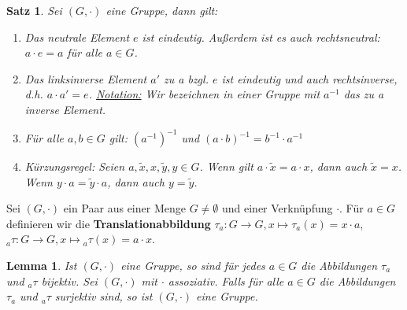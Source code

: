 \documentclass[12pt,a4paper]{article}
\theoremstyle{plain}
\newtheorem{Satz}[Theorem]{Satz}
\newtheorem{Lemma}[Theorem]{Lemma}
\numberwithin{equation}{section}
\begin{document}
\begin{Satz}
Sei $(G,\cdot)$ eine Gruppe, dann gilt:
\begin{enumerate}
\renewcommand{\labelenumi}{\emph{(\alph{enumi})}}
\item Das neutrale Element $e$ ist eindeutig. Außerdem ist es auch rechtsneutral: $a\cdot e=a$ für alle $a\in G$.
\item Das linksinverse Element $a'$ zu a bzgl. $e$ ist eindeutig und auch rechtsinverse, d.h. $a\cdot a'=e$. \underline{Notation:} Wir bezeichnen in einer Gruppe mit $a^{-1}$ das zu a inverse Element.
\item Für alle $a,b\in G$ gilt: $\left(a^{-1}\right)^{-1}$ und $(a\cdot b)^{-1}=b^{-1}\cdot a^{-1}$
\item Kürzungsregel: Seien $a,\tilde{x},x,\tilde{y},y\in G$. Wenn gilt $a\cdot \tilde{x}=a\cdot x$, dann auch $\tilde{x}=x$. Wenn $y\cdot a=\tilde{y}\cdot a$, dann auch $y=\tilde{y}$.
\end{enumerate}
\end{Satz}
Sei $(G,\cdot)$ ein Paar aus einer Menge $G\neq \emptyset$ und einer Verknüpfung $\cdot$. Für $a\in G$ definieren wir die \textbf{Translationabbildung} $\tau_a: G\rightarrow G, x\mapsto \tau_a(x)=x\cdot a$, $_a\tau: G \rightarrow G, x\mapsto {}_a\tau(x)=a\cdot x$.
\begin{Lemma}
Ist $(G,\cdot)$ eine Gruppe, so sind für jedes $a\in G$ die Abbildungen $\tau_a$ und $_a\tau$ bijektiv. Sei $(G,\cdot)$ mit $\cdot$ assoziativ. Falls für alle $a\in G$ die Abbildungen $\tau_a$ und $_a\tau$ surjektiv sind, so ist $(G,\cdot)$ eine Gruppe.
\end{Lemma}
\end{document}
